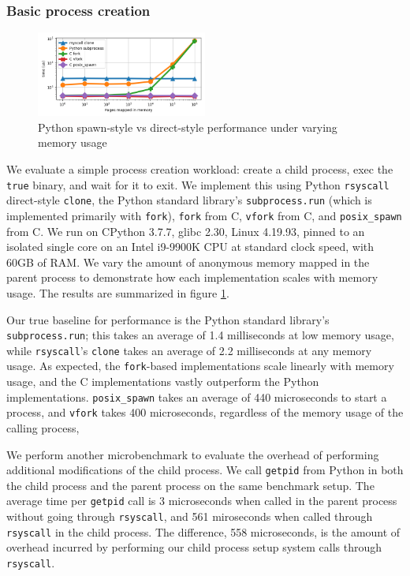 \documentclass[letterpaper,twocolumn,10pt]{article}
\begin{document}
\subsubsection{Basic process creation}
\begin{figure}[h!]
\centering
 \includegraphics[width=0.5\textwidth]{subprocess_bench}
 \caption{Python spawn-style vs direct-style performance under varying memory usage}
 \label{fig:subprocess_bench}
\end{figure}
We evaluate a simple process creation workload:
create a child process, exec the \texttt{true} binary, and wait for it to exit.
We implement this using Python \texttt{rsyscall} direct-style \texttt{clone},
the Python standard library's \texttt{subprocess.run} (which is implemented primarily with \texttt{fork}),
\texttt{fork} from C,
\texttt{vfork} from C,
and \texttt{posix\_spawn} from C.
We run on CPython 3.7.7, glibc 2.30, Linux 4.19.93,
pinned to an isolated single core on an Intel i9-9900K CPU at standard clock speed,
with 60GB of RAM.
We vary the amount of anonymous memory mapped in the parent process
to demonstrate how each implementation scales with memory usage.
The results are summarized in figure \ref{fig:subprocess_bench}.

Our true baseline for performance is the Python standard library's \texttt{subprocess.run};
this takes an average of 1.4 milliseconds at low memory usage,
while \texttt{rsyscall}'s \texttt{clone} takes an average of 2.2 milliseconds at any memory usage.
As expected, the \texttt{fork}-based implementations scale linearly with memory usage,
and the C implementations vastly outperform the Python implementations.
\texttt{posix\_spawn} takes an average of 440 microseconds to start a process,
and \texttt{vfork} takes 400 microseconds,
regardless of the memory usage of the calling process,

We perform another microbenchmark to evaluate the overhead of performing additional modifications of the child process.
We call \texttt{getpid} from Python
in both the child process and the parent process on the same benchmark setup.
The average time per \texttt{getpid} call is
3 microseconds when called in the parent process without going through \texttt{rsyscall},
and 561 miroseconds when called through \texttt{rsyscall} in the child process.
The difference, 558 microseconds,
is the amount of overhead incurred
by performing our child process setup system calls through \texttt{rsyscall}.
\end{document}

